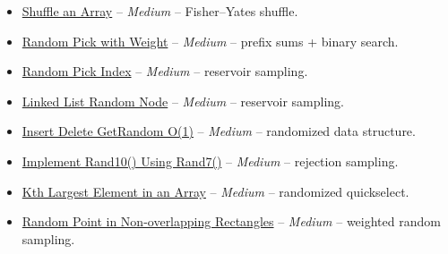\documentclass[11pt]{article}
\begin{document}
\begin{itemize}
  \item \href{https://leetcode.com/problems/shuffle-an-array/}{Shuffle an Array} -- \emph{Medium} -- Fisher--Yates shuffle.
  \item \href{https://leetcode.com/problems/random-pick-with-weight/}{Random Pick with Weight} -- \emph{Medium} -- prefix sums + binary search.
  \item \href{https://leetcode.com/problems/random-pick-index/}{Random Pick Index} -- \emph{Medium} -- reservoir sampling.
  \item \href{https://leetcode.com/problems/linked-list-random-node/}{Linked List Random Node} -- \emph{Medium} -- reservoir sampling.
  \item \href{https://leetcode.com/problems/insert-delete-getrandom-o1/}{Insert Delete GetRandom O(1)} -- \emph{Medium} -- randomized data structure.
  \item \href{https://leetcode.com/problems/implement-rand10-using-rand7/}{Implement Rand10() Using Rand7()} -- \emph{Medium} -- rejection sampling.
  \item \href{https://leetcode.com/problems/kth-largest-element-in-an-array/}{Kth Largest Element in an Array} -- \emph{Medium} -- randomized quickselect.
  \item \href{https://leetcode.com/problems/random-point-in-non-overlapping-rectangles/}{Random Point in Non-overlapping Rectangles} -- \emph{Medium} -- weighted random sampling.
\end{itemize}
\end{document}
